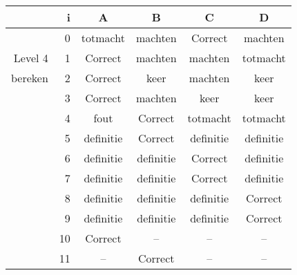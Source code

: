 \begin{tabular}{ rr| c|c|c|c}\hline\hline
     & i & \textbf{A} & \textbf{B} & \textbf{C} & \textbf{D}\\\hline

&0&totmacht&machten&Correct\cellcolor[gray]{0.6}&machten\\
Level 4 & 1&Correct\cellcolor[gray]{0.6}&machten&machten&totmacht\\
bereken &2&Correct\cellcolor[gray]{0.6}&keer&machten&keer\\
&3&Correct\cellcolor[gray]{0.6}&machten&keer&keer\\
&4&fout&Correct\cellcolor[gray]{0.6}&totmacht&totmacht\\
&5&definitie&Correct\cellcolor[gray]{0.6}&definitie&definitie\\
&6&definitie&definitie&Correct\cellcolor[gray]{0.6}&definitie\\
&7&definitie&definitie&Correct\cellcolor[gray]{0.6}&definitie\\
&8&definitie&definitie&definitie&Correct\cellcolor[gray]{0.6}\\
&9&definitie&definitie&definitie&Correct\cellcolor[gray]{0.6}\\
&10&Correct\cellcolor[gray]{0.6}&--&--&--\\
&11&--&Correct\cellcolor[gray]{0.6}&--&--\\
\hline\end{tabular}\par\ \newline

